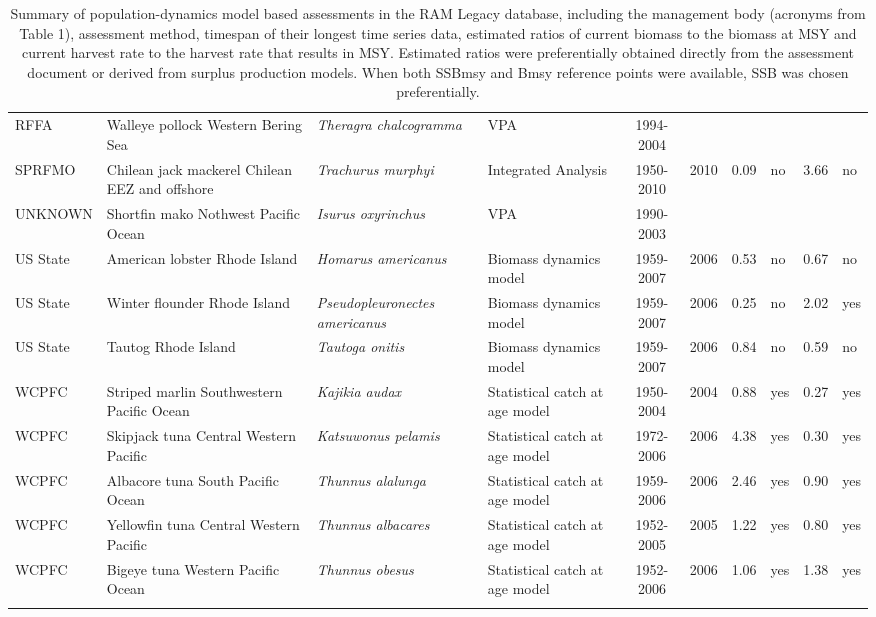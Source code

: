 \begin{longtable}{p{1.8cm}p{3.5cm}p{3.5cm}p{3cm}cccp{0.9cm}cp{0.9cm}}
  RFFA & Walleye pollock Western Bering Sea & \textit{Theragra chalcogramma} & VPA & 1994-2004 &  &  &  &  &  \\ 
  SPRFMO & Chilean jack mackerel Chilean EEZ and offshore & \textit{Trachurus murphyi} & Integrated Analysis & 1950-2010 & 2010 & 0.09 & no & 3.66 & no \\ 
  UNKNOWN & Shortfin mako Nothwest Pacific Ocean & \textit{Isurus oxyrinchus} & VPA & 1990-2003 &  &  &  &  &  \\ 
  US State & American lobster Rhode Island & \textit{Homarus americanus} & Biomass dynamics model & 1959-2007 & 2006 & 0.53 & no & 0.67 & no \\ 
  US State & Winter flounder Rhode Island & \textit{Pseudopleuronectes americanus} & Biomass dynamics model & 1959-2007 & 2006 & 0.25 & no & 2.02 & yes \\ 
  US State & Tautog Rhode Island & \textit{Tautoga onitis} & Biomass dynamics model & 1959-2007 & 2006 & 0.84 & no & 0.59 & no \\ 
  WCPFC & Striped marlin Southwestern Pacific Ocean & \textit{Kajikia audax} & Statistical catch at age model & 1950-2004 & 2004 & 0.88 & yes & 0.27 & yes \\ 
  WCPFC & Skipjack tuna Central Western Pacific & \textit{Katsuwonus pelamis} & Statistical catch at age model & 1972-2006 & 2006 & 4.38 & yes & 0.30 & yes \\ 
  WCPFC & Albacore tuna South Pacific Ocean & \textit{Thunnus alalunga} & Statistical catch at age model & 1959-2006 & 2006 & 2.46 & yes & 0.90 & yes \\ 
  WCPFC & Yellowfin tuna Central Western Pacific & \textit{Thunnus albacares} & Statistical catch at age model & 1952-2005 & 2005 & 1.22 & yes & 0.80 & yes \\ 
  WCPFC & Bigeye tuna Western Pacific Ocean & \textit{Thunnus obesus} & Statistical catch at age model & 1952-2006 & 2006 & 1.06 & yes & 1.38 & yes \\ 
   \hline
\hline
\caption{Summary of population-dynamics model based assessments in the RAM Legacy database, including the management body (acronyms from Table 1), assessment method, timespan of their longest time series data, estimated ratios of current biomass to the biomass at MSY and current harvest rate to the harvest rate that results in MSY. Estimated ratios were preferentially obtained directly from the assessment document or derived from surplus production models. When both SSBmsy and Bmsy reference points were available, SSB was chosen preferentially.}
\label{tab:crosshair}
\end{longtable}

